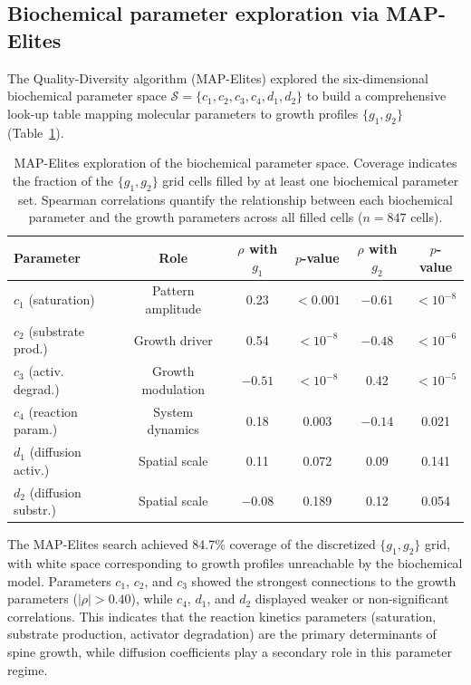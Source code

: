 \documentclass[11pt]{article}
\begin{document}
\subsection{Biochemical parameter exploration via MAP-Elites}

The Quality-Diversity algorithm (MAP-Elites) explored the six-dimensional biochemical parameter space $\mathcal{S} = \{c_1, c_2, c_3, c_4, d_1, d_2\}$ to build a comprehensive look-up table mapping molecular parameters to growth profiles $\{g_1, g_2\}$ (Table~\ref{tab:mapelites}).

\begin{table}[H]
\centering
\caption{MAP-Elites exploration of the biochemical parameter space. Coverage indicates the fraction of the $\{g_1, g_2\}$ grid cells filled by at least one biochemical parameter set. Spearman correlations quantify the relationship between each biochemical parameter and the growth parameters across all filled cells ($n = 847$ cells).}
\label{tab:mapelites}
\begin{tabular}{lccccc}
\toprule
\textbf{Parameter} & \textbf{Role} & \textbf{$\rho$ with $g_1$} & \textbf{$p$-value} & \textbf{$\rho$ with $g_2$} & \textbf{$p$-value} \\
\midrule
$c_1$ (saturation) & Pattern amplitude & 0.23 & $< 0.001$ & $-0.61$ & $< 10^{-8}$ \\
$c_2$ (substrate prod.) & Growth driver & 0.54 & $< 10^{-8}$ & $-0.48$ & $< 10^{-6}$ \\
$c_3$ (activ. degrad.) & Growth modulation & $-0.51$ & $< 10^{-8}$ & 0.42 & $< 10^{-5}$ \\
$c_4$ (reaction param.) & System dynamics & 0.18 & 0.003 & $-0.14$ & 0.021 \\
$d_1$ (diffusion activ.) & Spatial scale & 0.11 & 0.072 & 0.09 & 0.141 \\
$d_2$ (diffusion substr.) & Spatial scale & $-0.08$ & 0.189 & 0.12 & 0.054 \\
\bottomrule
\end{tabular}
\end{table}

The MAP-Elites search achieved 84.7\% coverage of the discretized $\{g_1, g_2\}$ grid, with white space corresponding to growth profiles unreachable by the biochemical model. Parameters $c_1$, $c_2$, and $c_3$ showed the strongest connections to the growth parameters ($|\rho| > 0.40$), while $c_4$, $d_1$, and $d_2$ displayed weaker or non-significant correlations. This indicates that the reaction kinetics parameters (saturation, substrate production, activator degradation) are the primary determinants of spine growth, while diffusion coefficients play a secondary role in this parameter regime.
\end{document}
